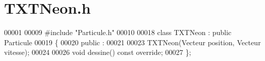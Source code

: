\section{T\+X\+T\+Neon.\+h}
\label{_t_x_t_neon_8h_source}

\begin{DoxyCode}
00001 
00009 \textcolor{preprocessor}{#include "Particule.h"}
00010 
00018 \textcolor{keyword}{class }TXTNeon : \textcolor{keyword}{public} Particule
00019 \{
00020     \textcolor{keyword}{public} :
00021     
00023     TXTNeon(Vecteur position, Vecteur vitesse);
00024     
00026     \textcolor{keywordtype}{void} dessine() \textcolor{keyword}{const override};
00027 \};
\end{DoxyCode}
